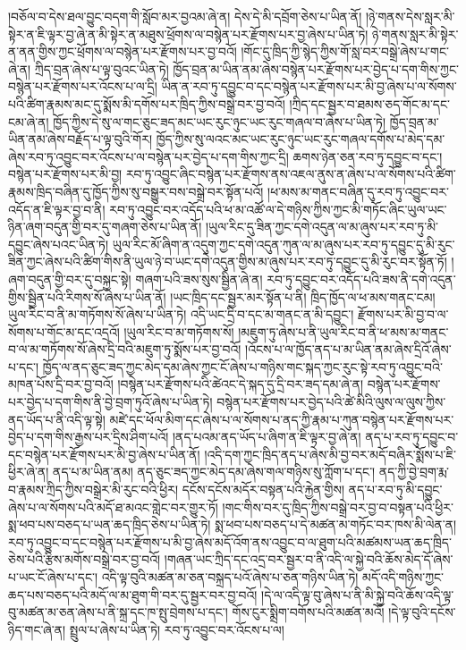 །བཅོལ་བ་དེས་ཐལ་བྱུང་བདག་གི་སློབ་མར་བྱའམ་ཞེ་ན། དེས་དེ་མི་དབྲོག་ཅེས་པ་ཡིན་ནོ། །ཉེ་གནས་དེས་སླར་མི་སྟེར་ན་ཇི་ལྟར་བྱ་ཞེ་ན་མི་སྟེར་ན་མཐུས་ཕྲོགས་ལ་བསྙེན་པར་རྫོགས་པར་བྱ་ཞེས་པ་ཡིན་ཏེ། ཉེ་གནས་སླར་མི་སྟེར་ན་ནན་གྱིས་ཀྱང་ཕྲོགས་ལ་བསྙེན་པར་རྫོགས་པར་བྱ་བའོ། །གོང་དུ་ཁྲིད་ཀྱི་སྙེད་ཀྱིས་གོ་སླ་བར་བསྒྲེ་ཞེས་པ་གང་ཞེ་ན། ཀྲིད་བྲན་ཞེས་པ་ལྟ་བུའང་ཡིན་ཏེ། ཁྱོད་བྲན་མ་ཡིན་ནམ་ཞེས་བསྙེན་པར་རྫོགས་པར་བྱེད་པ་དག་གིས་ཀྱང་བསྙེན་པར་རྫོགས་པར་འོངས་པ་ལ་དྲི། ཡིན་ན་རབ་ཏུ་དབྱུང་བ་དང་བསྙེན་པར་རྫོགས་པར་མི་བྱ་ཞེས་པ་ལ་སོགས་པའི་ཚིག་རྣམས་མང་དུ་སྨོས་མི་དགོས་པར་ཁྲིད་ཀྱིས་བསྒྲེ་བར་བྱ་བའོ། །ཀྲིད་དང་སྦྱར་བ་ཐམས་ཅད་གོང་མ་དང་ངམ་ཞེ་ན། ཁྱོད་ཀྱིས་དེ་སུ་ལ་གང་ཅུང་ཟད་མང་ཡང་རུང་ཉུང་ཡང་རུང་གཞལ་བ་ཞེས་པ་ཡིན་ཏེ། ཁྱོད་བྲན་མ་ཡིན་ནམ་ཞེས་བརྗོད་པ་ལྟ་བུའི་གོར། ཁྱོད་ཀྱིས་སུ་ལའང་མང་ཡང་རུང་ཉུང་ཡང་རུང་གཞལ་དགོས་པ་མེད་དམ་ཞེས་རབ་ཏུ་འབྱུང་བར་འོངས་པ་ལ་བསྙེན་པར་བྱེད་པ་དག་གིས་ཀྱང་དྲི། ཆགས་ཉེན་ཅན་རབ་ཏུ་དབྱུང་བ་དང་། བསྙེན་པར་རྫོགས་པར་མི་བྱ། རབ་ཏུ་འབྱུང་ཞིང་བསྙེན་པར་རྫོགས་ནས་འཇལ་ནུས་ན་ཞེས་པ་ལ་སོགས་པའི་ཚིག་རྣམས་ཁྲིད་བཞིན་དུ་ཁྱོད་ཀྱིས་སུ་བསྒྱུར་བས་བསྒྲེ་བར་སྟོན་པའོ། །ཕ་མས་མ་གནང་བཞིན་དུ་རབ་ཏུ་འབྱུང་བར་འདོད་ན་ཇི་ལྟར་བྱ་བ་ནི། རབ་ཏུ་འབྱུང་བར་འདོད་པའི་ཕ་མ་འཚོ་ལ་དེ་གཉིས་ཀྱིས་ཀྱང་མི་གཏོང་ཞིང་ཡུལ་ཡང་ཉིན་ཞག་བདུན་གྱི་བར་དུ་གཞག་ཅེས་པ་ཡིན་ནོ། །ཡུལ་རིང་དུ་ཟིན་ཀྱང་དགེ་འདུན་ལ་མ་ཞུས་པར་རབ་ཏུ་མི་དབྱུང་ཞེས་པའང་ཡིན་ཏེ། ཡུལ་རིང་མོ་ཞིག་ན་འདུག་ཀྱང་དགེ་འདུན་ཀུན་ལ་མ་ཞུས་པར་རབ་ཏུ་དབྱུང་དུ་མི་རུང་ཟིན་ཀྱང་ཞེས་པའི་ཚིག་གིས་ནི་ཡུལ་ཉེ་བ་ཡང་དགེ་འདུན་གྱིས་མ་ཞུས་པར་རབ་ཏུ་དབྱུང་དུ་མི་རུང་བར་སྟོན་ཏོ། །ཞག་བདུན་གྱི་བར་དུ་བསྐྱང་སྟེ། གཞག་པའི་ཟས་སུས་སྦྱིན་ཞེ་ན། རབ་ཏུ་དབྱུང་བར་འདོད་པའི་ཟས་ནི་དགེ་འདུན་གྱིས་སྦྱིན་པའི་རིགས་སོ་ཞེས་པ་ཡིན་ནོ། །ཡང་ཁྲིད་དང་སྦྱར་མར་སྟོན་པ་ནི། ཁྲིད་ཁྱོད་ལ་ཕ་མས་གནང་ངམ། ཡུལ་རིང་བ་ནི་མ་གཏོགས་སོ་ཞེས་པ་ཡིན་ཏེ། འདི་ཡང་དྲི་བ་དང་མ་གནང་ན་མི་དབྱུང་། རྫོགས་པར་མི་བྱ་བ་ལ་སོགས་པ་གོང་མ་དང་འདྲའོ། །ཡུལ་རིང་བ་མ་གཏོགས་སོ། །མཇུག་ཏུ་ཞེས་པ་ནི་ཡུལ་རིང་བ་ནི་ཕ་མས་མ་གནང་བ་ལ་མ་གཏོགས་སོ་ཞེས་དྲི་བའི་མཇུག་ཏུ་སྨོས་པར་བྱ་བའོ། །འོངས་པ་ལ་ཁྱོད་ནད་པ་མ་ཡིན་ནམ་ཞེས་དྲིའོ་ཞེས་པ་དང་། ཁྱོད་ལ་ནད་ཅུང་ཟད་ཀྱང་མེད་དམ་ཞེས་ཀྱང་ངོ་ཞེས་པ་གཉིས་གང་སྐད་ཀྱང་རུང་སྟེ་རབ་ཏུ་འབྱུང་བའི་མཁན་པོས་དྲི་བར་བྱ་བའོ། །བསྙེན་པར་རྫོགས་པའི་ཚེའང་དེ་སྐད་དུ་དྲི་བར་ཟད་དམ་ཞེ་ན། བསྙེན་པར་རྫོགས་པར་བྱེད་པ་དག་གིས་ནི་བྱེ་བྲག་ཏུའོ་ཞེས་པ་ཡིན་ཏེ། བསྙེན་པར་རྫོགས་པར་བྱེད་པའི་ཚེ་མིའི་ལུས་ལ་ལུས་ཀྱིས་ནད་ཡོད་པ་ནི་འདི་ལྟ་སྟེ། མཛེ་དང་ཕོལ་མིག་དང་ཞེས་པ་ལ་སོགས་པ་ནད་ཀྱི་རྣམ་པ་ཀུན་བསྙེན་པར་རྫོགས་པར་བྱེད་པ་དག་གིས་རྒྱས་པར་དྲིས་ཤིག་པའོ། །ནད་པའམ་ནད་ཡོད་པ་ཞིག་ན་ཇི་ལྟར་བྱ་ཞེ་ན། ནད་པ་རབ་ཏུ་དབྱུང་བ་དང་བསྙེན་པར་རྫོགས་པར་མི་བྱ་ཞེས་པ་ཡིན་ནོ། །འདི་དག་ཀྱང་ཁྲིད་ནད་པ་ཞེས་མི་བྱ་བར་མདོ་བཞིར་སྨོས་པ་ཇི་ཕྱིར་ཞེ་ན། ནད་པ་མ་ཡིན་ནམ། ནད་ཅུང་ཟད་ཀྱང་མེད་དམ་ཞེས་གལ་གཉིས་སུ་ཀློག་པ་དང་། ནད་ཀྱི་བྱེ་བྲག་རྨ་བ་རྣམས་ཀྲིད་ཀྱིས་བསྒྲེར་མི་རུང་བའི་ཕྱིར། དངོས་དངོས་མདོར་བསྟན་པའི་རྐྱེན་གྱིས། ནད་པ་རབ་ཏུ་མི་དབྱུང་ཞེས་པ་ལ་སོགས་པའི་མདོ་ཐ་མའང་གླེང་བར་གྱུར་ཏོ། །གང་གིས་བར་དུ་ཁྲིད་ཀྱིས་བསྒྲེ་བར་བྱ་བ་བསྟན་པའི་ཕྱིར་སྨ་ཕབ་པས་བཅད་པ་ཡན་ཆད་ཁྲིད་ཅེས་པ་ཡིན་ཏེ། སྨ་ཕབ་པས་བཅད་པ་དེ་མཚན་མ་གཏོང་བར་ཁས་མི་ལེན་ན། རབ་ཏུ་འབྱུང་བ་དང་བསྙེན་པར་རྫོགས་པ་མི་བྱ་ཞེས་མདོ་འོག་ནས་འབྱུང་བ་ལ་ཐུག་པའི་མཚམས་ཡན་ཆད་ཁྲིད་ཅེས་པའི་རྩིས་མགོས་བསྒྲེ་བར་བྱ་བའོ། །གཞན་ཡང་ཀྲིད་དང་འདྲ་བར་སྦྱར་བ་ནི་འདི་ལ་སྐྱེ་བའི་ཆོས་མེད་དོ་ཞེས་པ་ཡང་ངོ་ཞེས་པ་དང་། འདི་ལྟ་བུའི་མཚན་མ་ཅན་བསྐྲད་པའོ་ཞེས་པ་ཅན་གཉིས་ཡིན་ཏེ། མདོ་འདི་གཉིས་ཀྱང་ཆད་པས་བཅད་པའི་མདོ་ལ་མ་ཐུག་གི་བར་དུ་སྦྱར་བར་བྱ་བའོ། །དེ་ལ་འདི་ལྟ་བུ་ཞེས་པ་ནི་མི་སྐྱེ་བའི་ཆོས་འདི་ལྟ་བུ་མཚན་མ་ཅན་ཞེས་པ་ནི་སྐྲ་དང་ཁ་སྤུ་བྲེགས་པ་དང་། གོས་ངུར་སྨྲིག་བགོས་པའི་མཚན་མའོ། །དེ་ལྟ་བུའི་དངོས་ཉིད་གང་ཞེ་ན། སྤྲུལ་པ་ཞེས་པ་ཡིན་ཏེ། རབ་ཏུ་འབྱུང་བར་འོངས་པ་ལ། 